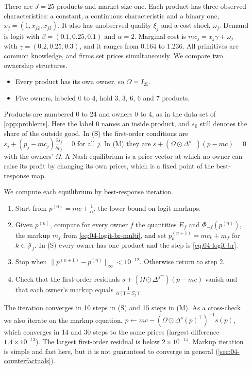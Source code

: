 \begin{example}\label{ex:04-logit25}
There are $J = 25$ products and market size one. Each product has three observed characteristics: a constant, a
continuous characteristic and a binary one, $x_j = (1, x_{j2}, x_{j3})$. It also has unobserved quality $\xi_j$ and
a cost shock $\omega_j$. Demand is logit with $\beta = (0.1, 0.25, 0.1)$ and $\alpha = 2$. Marginal cost is
$mc_j = x_j\gamma + \omega_j$ with $\gamma = (0.2, 0.25, 0.3)$, and it ranges from 0.164 to 1.236. All primitives
are common knowledge, and firms set prices simultaneously. We compare two ownership structures.
\begin{itemize}
  \item[(S)] Every product has its own owner, so $\Omega = I_{25}$.
  \item[(M)] Five owners, labeled 0 to 4, hold 3, 3, 6, 6 and 7 products.
\end{itemize}
Products are numbered 0 to 24 and owners 0 to 4, as in the data set of \cref{app:problems}. Here the label 0 names
an inside product, and $s_0$ still denotes the share of the outside good.
In (S) the first-order conditions are $s_j + (p_j - mc_j)\frac{\partial s_j}{\partial p_j} = 0$ for all $j$. In
(M) they are $s + (\Omega \odot \Delta^{s\top})(p - mc) = 0$ with the owners' $\Omega$. A Nash equilibrium is a
price vector at which no owner can raise its profit by changing its own prices, which is a fixed point of the
best-response map.
\end{example}

\begin{remark}\label{rem:04-logit25-algorithm}
We compute each equilibrium by best-response iteration.
\begin{enumerate}
  \item Start from $p^{(0)} = mc + \frac{1}{\alpha}$, the lower bound on logit markups.
  \item Given $p^{(n)}$, compute for every owner $f$ the quantities $E_f$ and $\Phi_{-f}(p^{(n)})$, the markup
  $m_f$ from \eqref{eq:04-logit-br-multi}, and set $p^{(n+1)}_k = mc_k + m_f$ for $k \in \mathcal{J}_f$. In (S)
  every owner has one product and the step is \eqref{eq:04-logit-br}.
  \item Stop when $\|p^{(n+1)} - p^{(n)}\|_\infty < 10^{-12}$. Otherwise return to step 2.
  \item Check that the first-order residuals $s + (\Omega \odot \Delta^{s\top})(p - mc)$ vanish and that each
  owner's markup equals $\frac{1}{\alpha(1 - S_f)}$.
\end{enumerate}
The iteration converges in 10 steps in (S) and 15 steps in (M). As a cross-check we also iterate on the markup
equation, $p \leftarrow mc - (\Omega \odot \Delta^s(p)^\top)^{-1}s(p)$, which converges in 14 and 30 steps to the
same prices (largest difference $1.4 \times 10^{-13}$). The largest first-order residual is below
$2 \times 10^{-14}$. Markup iteration is simple and fast here, but it is not guaranteed to converge in general
(\cref{sec:04-counterfactuals}).
\end{remark}

